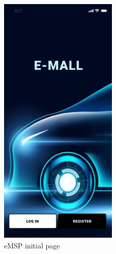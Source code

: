\documentclass{Configuration_Files/PoliMi3i_thesis}
\begin{document}
\begin{figure}[H]
    \centering
    \includegraphics[width=0.5\textwidth]{Images/user-interface/emsp/eMSP (1)-01.png}
    \caption{eMSP initial page}
\end{figure}
\end{document}
